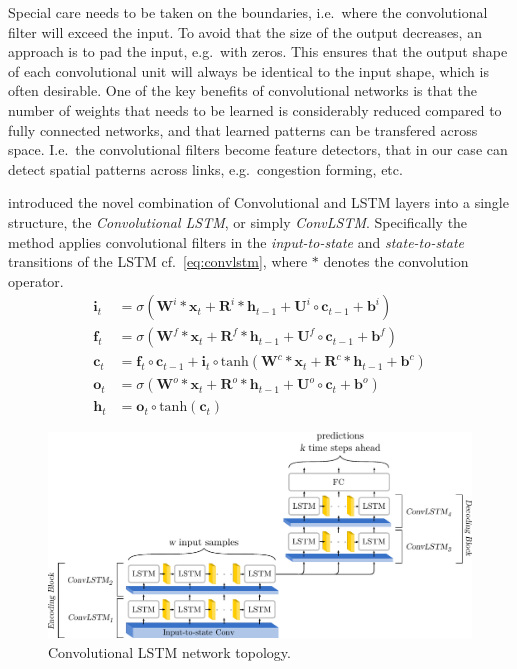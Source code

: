 ﻿\documentclass[preprint,11pt,5p,twocolumn]{elsarticle}
\newcommand{\matr}[1]{\mathbf{#1}}
\begin{document}
Special care needs to be taken on the boundaries, i.e.\ where the convolutional filter will exceed the input. To avoid that the size of the output decreases, an approach is to pad the input, e.g.\ with zeros. This ensures that the output shape of each convolutional unit will always be identical to the input shape, which is often desirable. One of the key benefits of convolutional networks is that the number of weights that needs to be learned is considerably reduced compared to fully connected networks, and that learned patterns can be transfered across space. I.e.\ the convolutional filters become feature detectors, that in our case can detect spatial patterns across links, e.g.\ congestion forming, etc.   

\citet{ConvLSTM} introduced the novel combination of Convolutional and LSTM layers into a single structure, the \emph{Convolutional LSTM}, or simply \emph{ConvLSTM}. Specifically the method applies convolutional filters in the \emph{input-to-state} and \emph{state-to-state} transitions of the LSTM cf.~\cref{eq:convlstm}, where $*$ denotes the convolution operator.
\begin{equation}
\begin{aligned}
  \matr{i}_t &= \sigma \left( \matr{W}^i * \matr{x}_t + \matr{R}^i * \matr{h}_{t-1} + \matr{U}^i \circ \matr{c}_{t-1} + \matr{b}^i \right) \\
  \matr{f}_t &= \sigma \left( \matr{W}^f * \matr{x}_t + \matr{R}^f * \matr{h}_{t-1} + \matr{U}^f \circ \matr{c}_{t-1} + \matr{b}^f \right) \\
  \matr{c}_t &= \matr{f}_t \circ \matr{c}_{t-1} + \matr{i}_t \circ \mathrm{tanh} \left( \matr{W}^c * \matr{x}_t + \matr{R}^c * \matr{h}_{t-1} + \matr{b}^c \right) \\
  \matr{o}_t &= \sigma \left( \matr{W}^\mathit{o} * \matr{x}_t + \matr{R}^\mathit{o} * \matr{h}_{t-1} + \matr{U}^\mathit{o} \circ \matr{c}_{t} + \matr{b}^o \right) \\
  \matr{h}_t &= \matr{o}_t \circ \mathrm{tanh} \left( \matr{c}_t \right)
\end{aligned}
\label{eq:convlstm}
\end{equation}
\vspace{.5em}

\begin{figure}[!t]
  \centering
  \includegraphics[scale=.75]{drawings/conv_lstm.pdf}
  \caption{Convolutional LSTM network topology.}
  \label{fig:ConvLSTM}
\end{figure}
\end{document}
